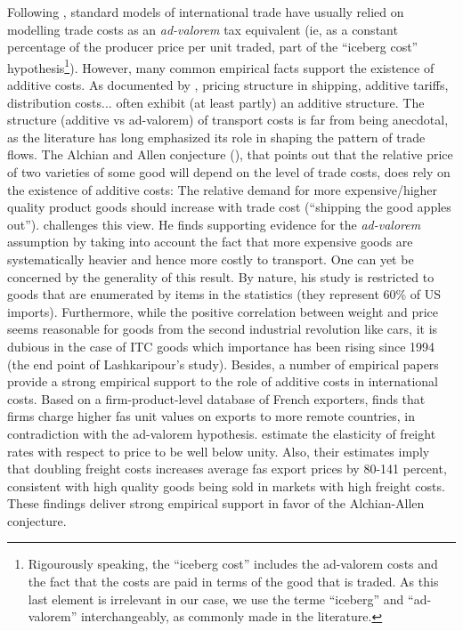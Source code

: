\documentclass[a4paper,11pt]{article}
\begin{document}
Following \citet{samuelson1954}, standard models of international trade have usually relied on modelling trade costs as an \emph{ad-valorem} tax equivalent (ie, as a constant percentage of the producer price per unit traded, part of the ``iceberg cost'' hypothesis\footnote{Rigourously speaking, the ``iceberg cost'' includes the ad-valorem costs and the fact that the costs are paid in terms of the good that is traded. As this last element is irrelevant in our case, we use the terme ``iceberg'' and ``ad-valorem'' interchangeably, as commonly made in the literature.}). However, many common empirical facts support the existence of additive costs. As documented by \citet{Irrazabal_2015}, pricing structure in shipping, additive tariffs, distribution costs... often exhibit (at least partly) an additive structure. The structure (additive vs ad-valorem) of transport costs is far from being anecdotal, as the literature has long emphasized its role in shaping the pattern of trade flows. The Alchian and Allen conjecture (\citealp{alchian}), that points out that the relative price of two varieties of some good will depend on the level of trade costs, does rely on the existence of additive costs: The relative demand for more expensive/higher quality product goods should increase with trade cost (``shipping the good apples out''). \citet{Lashkaripour-mimeo-2016} challenges this view. He finds supporting evidence for the \emph{ad-valorem} assumption by taking into account the fact that more expensive goods are systematically heavier and hence more costly to transport. One can yet be concerned by the generality of this result. By nature, his study is restricted to goods that are enumerated by items in the statistics (they represent 60\% of US imports). Furthermore, while the positive correlation between weight and price seems reasonable for goods from the second industrial revolution like cars, it is dubious in the case of ITC goods which importance has been rising since 1994 (the end point of Lashkaripour's study). Besides, a number of empirical papers provide a strong empirical support to the role of additive costs in international costs. Based on a firm-product-level database of French exporters, \citet{martin2012} finds that firms charge higher fas unit values on exports to more remote countries, in contradiction with the ad-valorem hypothesis. \citet{hummels_skiba} estimate the elasticity of freight rates with respect to price to be well below unity. Also, their estimates imply that doubling freight costs increases average fas export prices by 80-141 percent, consistent with high quality goods being sold in markets with high freight costs. These findings deliver strong empirical support in favor of the Alchian-Allen conjecture.
\smallskip
\end{document}
